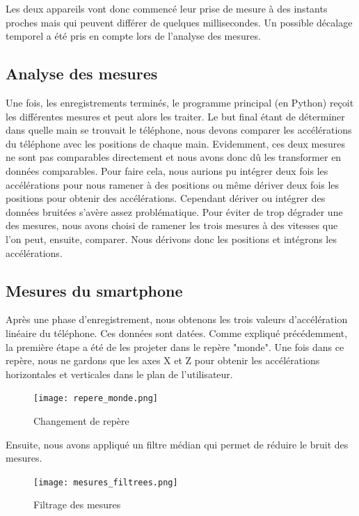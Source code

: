 \documentclass[12pt, french]{article}
\begin{document}
Les deux appareils vont donc commencé leur prise de mesure à des instants proches mais qui peuvent différer de quelques millisecondes. Un possible décalage temporel a été pris en compte lors de l'analyse des mesures.


\subsection{Analyse des mesures}

Une fois, les enregistrements terminés, le programme principal (en Python) reçoit les différentes mesures et peut alors les traiter. Le but final étant de déterminer dans quelle main se trouvait le téléphone, nous devons comparer les accélérations du téléphone avec les positions de chaque main. Evidemment, ces deux mesures ne sont pas comparables directement et nous avons donc dû les transformer en données comparables. Pour faire cela, nous aurions pu intégrer deux fois les accélérations pour nous ramener à des positions ou même dériver deux fois les positions pour obtenir des accélérations. Cependant dériver ou intégrer des données bruitées s'avère assez problématique. Pour éviter de trop dégrader une des mesures, nous avons choisi de ramener les trois mesures à des vitesses que l'on peut, ensuite, comparer. Nous dérivons donc les positions et intégrons les accélérations.

\subsection{Mesures du smartphone}

Après une phase d'enregistrement, nous obtenons les trois valeurs d'accélération linéaire du téléphone. Ces données sont datées. Comme expliqué précédemment, la première étape a été de les projeter dans le repère "monde". Une fois dans ce repère, nous ne gardons que les axes X et Z pour obtenir les accélérations horizontales et verticales dans le plan de l'utilisateur.

\begin{figure}[H]
\centering
\texttt{[image: repere\_monde.png]}
\caption{Changement de repère}
\label{fig6}
\end{figure}


Ensuite, nous avons appliqué un filtre médian qui permet de réduire le bruit des mesures.

\begin{figure}[H]
\centering
\texttt{[image: mesures\_filtrees.png]}
\caption{Filtrage des mesures}
\label{fig7}
\end{figure}
\end{document}
